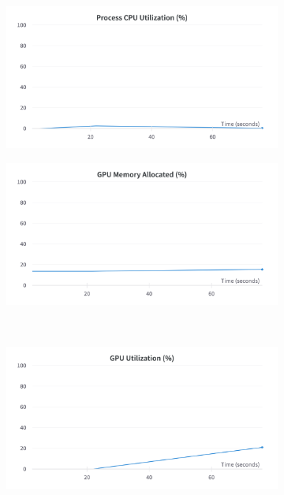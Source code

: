 \begin{figure}[H]
	\centering
	\begin{subfigure}{0.43\textwidth}
		\centering
		\includegraphics[width=\textwidth]{chapters/3_models/imgs/ufnc/ufcncpusage.png}
	\end{subfigure}
	\hspace{.5cm}
	\begin{subfigure}{0.43\textwidth}
		\centering
		\includegraphics[width=\textwidth]{chapters/3_models/imgs/ufnc/ufcnmem.png}
	\end{subfigure}\\
	\begin{subfigure}{0.43\textwidth}
		\centering
		\includegraphics[width=\textwidth]{chapters/3_models/imgs/ufnc/ufcnusagevera.png}

\end{subfigure}
\end{figure}

